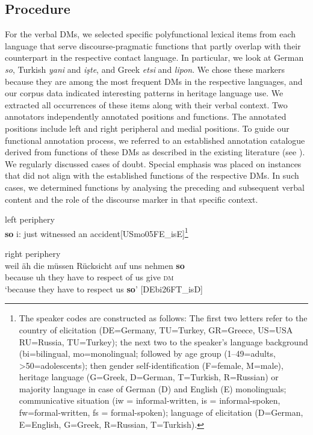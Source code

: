 \documentclass[output=paper,colorlinks,citecolor=brown]{langscibook}
\begin{document}
\subsection{Procedure}
\label{sec:sub:labrenzetal:Procedure}
For the verbal DMs, we selected specific polyfunctional lexical items \citep[1]{pichler_introduction_2016} from each language that serve discourse-pragmatic functions that partly overlap with their counterpart in the respective contact language. In particular, we look at German \textit{so}, Turkish \textit{yani} and \textit{işte}, and Greek \textit{etsi} and \textit{lipon}. We chose these markers because they are among the most frequent DMs in the respective languages, and our corpus data indicated interesting patterns in heritage language use. We extracted all occurrences of these items along with their verbal context. Two annotators independently annotated positions and functions. The annotated positions include left  and right  peripheral and medial  positions. To guide our functional annotation process, we referred to an established annotation catalogue derived from functions of these DMs as described in the existing literature (see ). We regularly discussed cases of doubt. Special emphasis was placed on instances that did not align with the established functions of the respective DMs. In such cases, we determined functions by analysing the preceding and subsequent verbal content and the role of the discourse marker in that specific context.

\ea left periphery \label{ex:labrenzetal:1}\\
{\textbf{so} i: just witnessed an accident}\hfill[USmo05FE\_isE]\footnote{The speaker codes are constructed as follows: The first two letters refer to the country of elicitation (DE=Germany, TU=Turkey, GR=Greece, US=USA RU=Russia, TU=Turkey); the next two to the speaker’s language background (bi=bilingual, mo=monolingual; followed by age group (1--49=adults, >50=adolescents); then gender self-identification (F=female, M=male), heritage language (G=Greek, D=German, T=Turkish, R=Russian) or majority language in case of German (D) and English (E) monolinguals; communicative situation (iw = informal-written, is = informal-spoken, fw=formal-written, fs = formal-spoken); language of elicitation (D=German, E=English, G=Greek, R=Russian, T=Turkish).}\\
\z

\ea right periphery \label{ex:labrenzetal:2} \\
\gll weil äh die müssen Rücksicht auf uns nehmen \textbf{so} \\ 
because uh they {have to} respect of us give \textsc{dm} \\
\glt `because they have to respect us \textbf{so}' \hfill[DEbi26FT\_isD]
\z
\end{document}
